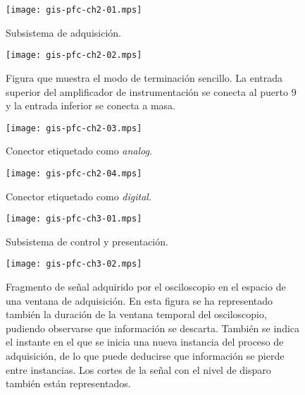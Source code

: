 \documentclass[a4paper,12pt]{article}
\begin{document}
\begin{figure}
	\begin{center}
		\texttt{[image: gis-pfc-ch2-01.mps]}
	\end{center}
	\caption[Subsistema de adquisición]{Subsistema de adquisición.}
	\label{fig:subacqui}
\end{figure}

\begin{figure}
	\begin{center}
		\texttt{[image: gis-pfc-ch2-02.mps]}
	\end{center}
	\caption[Ejemplo de configuración de terminación]{Figura que muestra el modo de terminación sencillo. La entrada superior del amplificador de instrumentación se conecta al puerto 9 y la entrada inferior se conecta a masa.}
	\label{fig:termmodes}
\end{figure}

\begin{figure}
	\begin{center}
		\texttt{[image: gis-pfc-ch2-03.mps]}
	\end{center}
	\caption[Conector etiquetado como \emph{analog}]{Conector etiquetado como \emph{analog}.}
	\label{fig:analog}
\end{figure}

\clearpage

\begin{figure}
	\begin{center}
		\texttt{[image: gis-pfc-ch2-04.mps]}
	\end{center}
	\caption[Conector etiquetado como \emph{digital}]{Conector etiquetado como \emph{digital}.}
	\label{fig:digital}
\end{figure}

\begin{figure}
	\begin{center}
		\texttt{[image: gis-pfc-ch3-01.mps]}
	\end{center}
	\caption[Subsistema de control y presentación]{Subsistema de control y presentación.}
	\label{sub:control}
\end{figure}

\begin{figure}
	\begin{center}
		\texttt{[image: gis-pfc-ch3-02.mps]}
	\end{center}
	\caption[Fragmento de señal adquirido por el osciloscopio en el espacio de una ventana de adquisición]{Fragmento de señal adquirido por el osciloscopio en el espacio de una ventana de adquisición. En esta figura se ha representado también la duración de la ventana temporal del osciloscopio, pudiendo observarse que información se descarta. También se indica el instante en el que se inicia una nueva instancia del proceso de adquisición, de lo que puede deducirse que información se pierde entre instancias. Los cortes de la señal con el nivel de disparo también están representados.}
	\label{fig:freesignal}
\end{figure}
\end{document}
